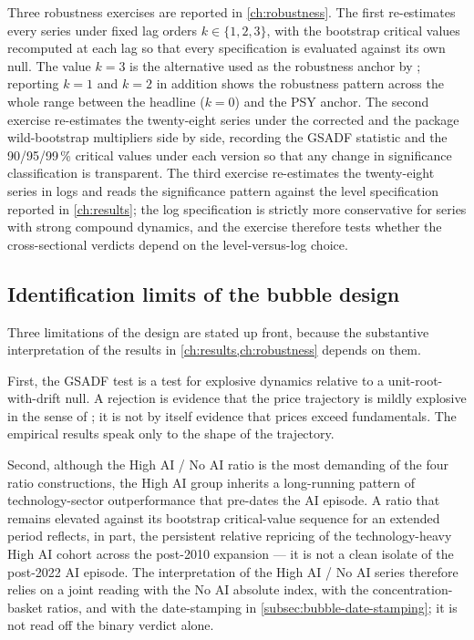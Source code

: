 Three robustness exercises are reported in \cref{ch:robustness}.
The first re-estimates every series under fixed lag orders
$k \in \{1, 2, 3\}$, with the bootstrap critical values recomputed
at each lag so that every specification is evaluated against its
own null. The value $k = 3$ is the alternative used as the
robustness anchor by \citet[footnote~22]{phillipsShiYu2015a};
reporting $k = 1$ and $k = 2$ in addition shows the robustness
pattern across the whole range between the headline ($k = 0$) and
the PSY anchor. The second exercise re-estimates the twenty-eight
series under the corrected and the package wild-bootstrap
multipliers side by side, recording the GSADF statistic and the
90/95/99\,\% critical values under each version so that any change
in significance classification is transparent. The third exercise
re-estimates the twenty-eight series in logs and reads the
significance pattern against the level specification reported in
\cref{ch:results}; the log specification is strictly more
conservative for series with strong compound dynamics, and the
exercise therefore tests whether the cross-sectional verdicts
depend on the level-versus-log choice.
 
 
\subsection{Identification limits of the bubble design}
\label{subsec:bubble-design-limitations}
 
Three limitations of the design are stated up front, because the
substantive interpretation of the results in
\cref{ch:results,ch:robustness} depends on them.
 
First, the GSADF test is a test for explosive dynamics relative to a
unit-root-with-drift null. A rejection is evidence that the price
trajectory is mildly explosive in the sense of
\citet{phillipsMagdalinos2007}; it is not by itself evidence that
prices exceed fundamentals. The empirical results speak only to the
shape of the trajectory.
 
Second, although the High AI / No AI ratio is the most demanding of
the four ratio constructions, the High AI group inherits a
long-running pattern of technology-sector outperformance that
pre-dates the AI episode. A ratio that remains elevated against its
bootstrap critical-value sequence for an extended period reflects, in
part, the persistent relative repricing of the technology-heavy High
AI cohort across the post-2010 expansion --- it is not a clean
isolate of the post-2022 AI episode. The interpretation of the High
AI / No AI series therefore relies on a joint reading with the No AI
absolute index, with the concentration-basket ratios, and with the
date-stamping in \cref{subsec:bubble-date-stamping}; it is not read
off the binary verdict alone.
 
